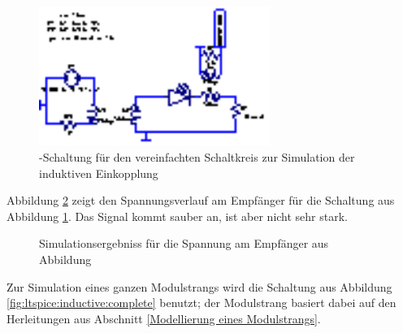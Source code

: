 \begin{figure}[h!tb]
    \centering
    \includegraphics[width=0.67\textwidth]{images/ltspice/jac/inductive-singleModule.eps}
    \caption[Induktive Einkopplung, vereinfachte -Schaltung]{%
        -Schaltung f\"ur den vereinfachten Schaltkreis zur
        Simulation der induktiven Einkopplung%
    }
    \label{fig:ltspice:inductive:singleModule}
\end{figure}

Abbildung  \ref{fig:simu:inductive:singleModule}  zeigt  den  Spannungsverlauf
am      Empf\"anger      f\"ur      die      Schaltung      aus      Abbildung
\ref{fig:ltspice:inductive:singleModule}. Das Signal kommt sauber an, ist aber
nicht sehr stark.

\begin{figure}[h!tb]
    
    \caption[Simulationsergebniss induktive Einkopplung, vereinfachte Schaltung]{%
        Simulationsergebniss f\"ur die Spannung am Empf\"anger aus Abbildung
        \label{fig:ltspice:inductive:singleModule}%
    }
    \label{fig:simu:inductive:singleModule}
\end{figure}

Zur  Simulation eines  ganzen Modulstrangs  wird die  Schaltung aus  Abbildung
\ref{fig:ltspice:inductive:complete}  benutzt; der  Modulstrang basiert  dabei
auf den Herleitungen aus Abschnitt \ref{Modellierung eines Modulstrangs}.

